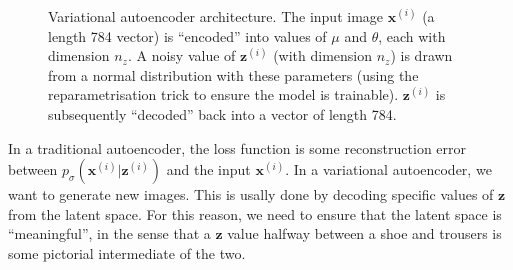 \documentclass[]{article}
\begin{document}
\begin{figure}
  \caption{Variational autoencoder architecture. The input image $\bm{x}^{(i)}$ (a length 784 vector) is ``encoded'' into values of $\mu$ and $\theta$, each with dimension $n_z$. A noisy value of $\bm{z}^{(i)}$ (with dimension $n_z$) is drawn from a normal distribution with these parameters (using the reparametrisation trick to ensure the model is trainable). $\bm{z}^{(i)}$ is subsequently ``decoded'' back into a vector of length 784.}
  \label{fig:neuralnet}
\end{figure}

In a traditional autoencoder, the loss function is some reconstruction error between $p_{\sigma}(\bm{x}^{(i)}|\bm{z}^{(i)})$ and the input $\bm{x}^{(i)}$. In a variational autoencoder, we want to generate new images. This is usally done by decoding specific values of $\bm{z}$ from the latent space. For this reason, we need to ensure that the latent space is ``meaningful'', in the sense that a $\bm{z}$ value halfway between a shoe and trousers is some pictorial intermediate of the two.
\end{document}
